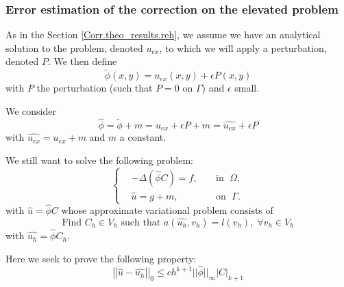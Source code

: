 \subsubsection{Error estimation of the correction on the elevated problem} \label{Corr.theo_results.error_reh}

As in the Section \ref{Corr.theo_results.reh}, we assume we have an analytical solution to the problem, denoted $u_{ex}$, to which we will apply a perturbation, denoted $P$. We then define
\begin{equation*}
	\tilde{\phi}(x,y) = u_{ex}(x,y)+\epsilon P(x,y)
\end{equation*}
with $P$ the perturbation (such that $P=0$ on $\Gamma$) and $\epsilon$ small.

We consider
$$\hat{\phi}=\tilde{\phi}+m=u_{ex}+\epsilon P+m=\hat{u_{ex}}+\epsilon P$$
with $\hat{u_{ex}}=u_{ex}+m$ and $m$ a constant.

We still want to solve the following problem:
\begin{equation*}
	\left\{\begin{aligned}
		&-\Delta (\hat{\phi}C)=f, \; &&\text{in } \; \Omega, \\
		&\hat{u}=g+m, \; &&\text{on } \; \Gamma.
	\end{aligned}\right. \label{pb_reh} %
\end{equation*}
with $\hat{u}=\hat{\phi}C$ whose approximate variational problem consists of
\begin{equation*}
	\text{Find } C_h\in V_h \text{ such that } a(\hat{u_h},v_h)=l(v_h), \;\forall v_h\in V_h
\end{equation*}
with $\hat{u_h}=\hat{\phi}C_h$.

Here we seek to prove the following property:
\begin{equation*}
	\left|\left|\hat{u}-\hat{u_h}\right|\right|_0\le ch^{k+1}||\hat{\phi}||_\infty\left|C\right|_{k+1}
\end{equation*}

